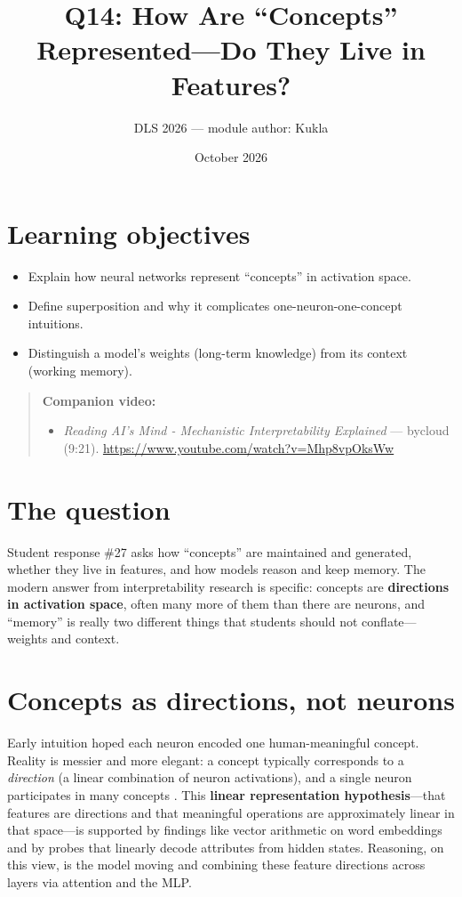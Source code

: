 \documentclass[11pt]{article}
\title{Q14: How Are ``Concepts'' Represented---Do They Live in Features?}
\author{DLS 2026 --- module author: Kukla}
\date{October 2026}
\begin{document}
\maketitle

\section*{Learning objectives}
\begin{itemize}[leftmargin=1.4em]
\item Explain how neural networks represent ``concepts'' in activation space.
\item Define superposition and why it complicates one-neuron-one-concept intuitions.
\item Distinguish a model's weights (long-term knowledge) from its context (working memory).
\end{itemize}

\begin{quote}\small\textbf{Companion video:}\begin{itemize}\setlength\itemsep{0pt}\item \emph{Reading AI's Mind - Mechanistic Interpretability Explained} --- bycloud (9:21). \url{https://www.youtube.com/watch?v=Mhp8vpOksWw}\end{itemize}\end{quote}

\section{The question}
Student response \#27 asks how ``concepts'' are maintained and generated, whether they live in features,
and how models reason and keep memory. The modern answer from interpretability research is specific:
concepts are \textbf{directions in activation space}, often many more of them than there are neurons, and
``memory'' is really two different things that students should not conflate---weights and context.

\section{Concepts as directions, not neurons}
Early intuition hoped each neuron encoded one human-meaningful concept. Reality is messier and more
elegant: a concept typically corresponds to a \emph{direction} (a linear combination of neuron
activations), and a single neuron participates in many concepts \citep{olah2020zoom}. This
\textbf{linear representation hypothesis}---that features are directions and that meaningful operations are
approximately linear in that space---is supported by findings like vector arithmetic on word embeddings and
by probes that linearly decode attributes from hidden states. Reasoning, on this view, is the model moving
and combining these feature directions across layers via attention and the MLP.
\end{document}
